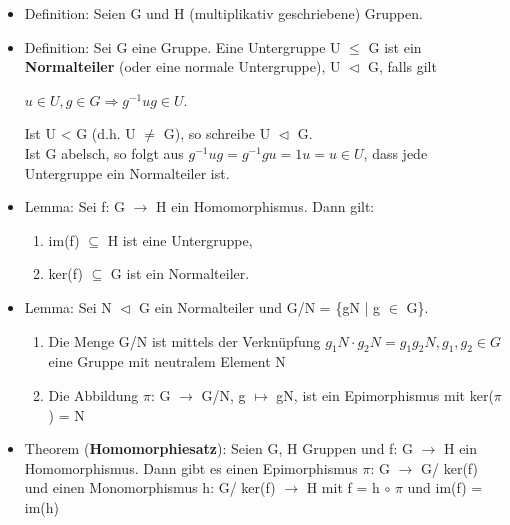 \begin{itemize}
\item Definition: Seien G und H (multiplikativ geschriebene) Gruppen.
\item Definition: Sei G eine Gruppe. Eine Untergruppe U $\le$ G ist ein \textbf{Normalteiler} (oder eine normale Untergruppe), U $\vartriangleleft$ G, falls gilt
\begin{center}
$u \in U, g \in G \Rightarrow g^{-1}ug \in U$.
\end{center}
Ist U < G (d.h. U $\neq$ G), so schreibe U $\vartriangleleft$ G.\\
Ist G abelsch, so folgt aus $g^{-1}ug = g^{-1}gu = 1u = u \in U$, dass jede Untergruppe ein Normalteiler ist.
\item Lemma: Sei f: G $\to$ H ein Homomorphismus. Dann gilt:
\begin{enumerate}
\item im(f) $\subseteq$ H ist eine Untergruppe,
\item ker(f) $\subseteq$ G ist ein Normalteiler.
\end{enumerate}
\item Lemma: Sei N $\vartriangleleft$ G ein Normalteiler und G/N = \{gN | g $\in$ G\}.
\begin{enumerate}
\item Die Menge G/N ist mittels der Verknüpfung $g_1N \cdot g_2N = g_1g_2N, g_1,g_2 \in G$ eine Gruppe mit neutralem Element N
\item Die Abbildung $\pi$: G $\to$ G/N, g $\mapsto$ gN, ist ein Epimorphismus mit ker($\pi$) = N
\end{enumerate}
\item Theorem (\textbf{Homomorphiesatz}): Seien G, H Gruppen und f: G $\to$ H ein Homomorphismus. Dann gibt es einen Epimorphismus $\pi$: G $\to$ G/ ker(f) und einen Monomorphismus h: G/ ker(f) $\to$ H mit f = h $\circ$ $\pi$ und im(f) = im(h)

\end{itemize}
